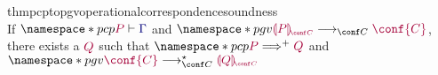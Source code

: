 \documentclass[main.tex]{subfiles}
\begin{document}
\begin{compacttheorems}
\begin{restatabletheorem}{thmpcptopgvoperationalcorrespondencesoundness}
    \hfill\\%
    If $\pcp{\seq{P}{\ty{\Gamma}}}$ and $\pgv{\tm{\cpgvC{P}}\cred\tm{\conf{C}}}$, there exists a $\tm{Q}$ such that $\pcp{\tm{P}\red^+\tm{Q}}$ and $\pgv{\tm{\conf{C}}\cred^\star\tm{\cpgvC{Q}}}$
  \end{restatabletheorem}
\end{compacttheorems}
\end{document}
